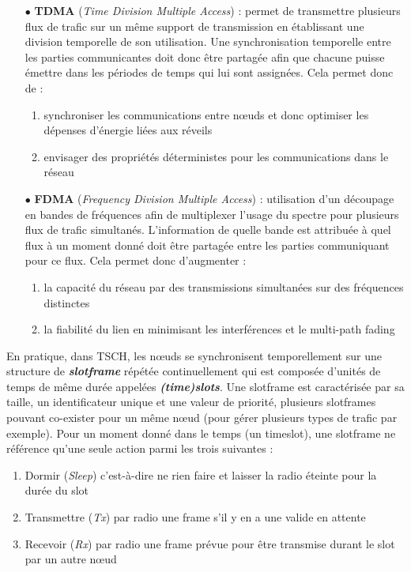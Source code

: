 \documentclass[]{report}
\begin{document}
\begin{itemize}
\item[$\bullet$] \textbf{TDMA} (\textit{Time Division Multiple Access}) : permet de transmettre plusieurs flux de trafic sur un même support de transmission en établissant une division temporelle de son utilisation. Une synchronisation temporelle entre les parties communicantes doit donc être partagée afin que chacune puisse émettre dans les périodes de temps qui lui sont assignées. Cela permet donc de \cite{ietf-6tisch-architecture-28} :
\begin{enumerate}
\item synchroniser les communications entre nœuds et donc optimiser les dépenses d'énergie liées aux réveils
\item envisager des propriétés déterministes pour les communications dans le réseau
\end{enumerate}
\vspace{0.2cm}
\item[$\bullet$] \textbf{FDMA} (\textit{Frequency Division Multiple Access}) : utilisation d'un découpage en bandes de fréquences afin de multiplexer l'usage du spectre pour plusieurs flux de trafic simultanés. L'information de quelle bande est attribuée à quel flux à un moment donné doit être partagée entre les parties communiquant pour ce flux. Cela permet donc d'augmenter :
\begin{enumerate}
\item la capacité du réseau par des transmissions simultanées sur des fréquences distinctes
\item la fiabilité du lien en minimisant les interférences et le multi-path fading \cite{rfc7554} 
\end{enumerate}
\end{itemize}

\vspace{0.1cm}

\par En pratique, dans TSCH, les nœuds se synchronisent temporellement sur une structure de \textbf{\textit{slotframe}} répétée continuellement qui est composée d'unités de temps de même durée appelées \textbf{\textit{(time)slots}}. Une slotframe est caractérisée par sa taille, un identificateur unique et une valeur de priorité, plusieurs slotframes pouvant co-exister pour un même nœud (pour gérer plusieurs types de trafic par exemple). Pour un moment donné dans le temps (un timeslot), une slotframe ne référence qu'une seule action parmi les trois suivantes :
\vspace{0.1cm}
\begin{enumerate}
\item Dormir (\textit{Sleep}) c'est-à-dire ne rien faire et laisser la radio éteinte pour la durée du slot
\item Transmettre (\textit{Tx}) par radio une frame s'il y en a une valide en attente
\item Recevoir (\textit{Rx}) par radio une frame prévue pour être transmise durant le slot par un autre nœud
\end{enumerate}
\vspace{0.1cm}
\end{document}
